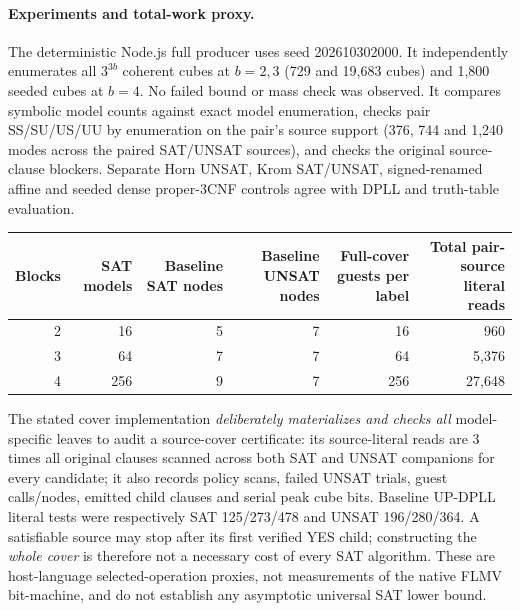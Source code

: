 \documentclass[11pt]{article}
\begin{document}
\paragraph{Experiments and total-work proxy.}
The deterministic Node.js full producer uses seed 202610302000. It independently enumerates all $3^{3b}$ coherent cubes at $b=2,3$ (729 and 19,683 cubes) and 1,800 seeded cubes at $b=4$. No failed bound or mass check was observed. It compares symbolic model counts against exact model enumeration, checks pair SS/SU/US/UU by enumeration on the pair's source support (376, 744 and 1,240 modes across the paired SAT/UNSAT sources), and checks the original source-clause blockers. Separate Horn UNSAT, Krom SAT/UNSAT, signed-renamed affine and seeded dense proper-3CNF controls agree with DPLL and truth-table evaluation.

\begin{center}
\begin{tabular}{rrrrrr}
\toprule
Blocks & SAT models & Baseline SAT nodes & Baseline UNSAT nodes & Full-cover guests per label & Total pair-source literal reads\\
\midrule
2&16&5&7&16&960\\
3&64&7&7&64&5,376\\
4&256&9&7&256&27,648\\
\bottomrule
\end{tabular}
\end{center}
The stated cover implementation \emph{deliberately materializes and checks all} model-specific leaves to audit a source-cover certificate: its source-literal reads are 3 times all original clauses scanned across both SAT and UNSAT companions for every candidate; it also records policy scans, failed UNSAT trials, guest calls/nodes, emitted child clauses and serial peak cube bits. Baseline UP-DPLL literal tests were respectively SAT 125/273/478 and UNSAT 196/280/364. A satisfiable source may stop after its first verified YES child; constructing the \emph{whole cover} is therefore not a necessary cost of every SAT algorithm. These are host-language selected-operation proxies, not measurements of the native FLMV bit-machine, and do not establish any asymptotic universal SAT lower bound.
\end{document}
